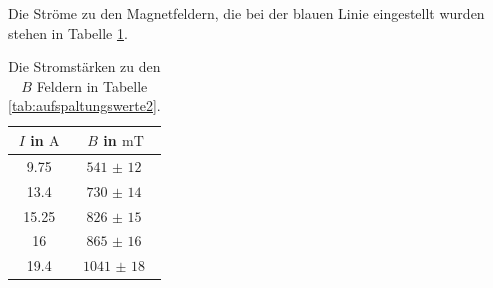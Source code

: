 \documentclass[
  bibliography=totoc,     %
  captions=tableheading,  %
  titlepage=firstiscover, %
]{scrartcl}
\begin{document}
\noindent
Die Ströme zu den Magnetfeldern, die bei der blauen Linie eingestellt wurden stehen
in Tabelle \ref{tab:ströme}.
\begin{table}[H]
  \centering
  \caption{Die Stromstärken zu den $B$ Feldern in Tabelle \ref{tab:aufspaltungswerte2}.}
  \label{tab:ströme}
  \begin{tabular}{c c}
    \toprule
    $I$ in $\si{\ampere}$ & $B$ in $\si{\milli\tesla}$ \\
    \midrule
    9.75  & $\SI{541(12)}{}$  \\
    13.4  & $\SI{730(14)}{}$  \\
    15.25 & $\SI{826(15)}{}$  \\
    16    & $\SI{865(16)}{}$  \\
    19.4  & $\SI{1041(18)}{}$ \\
    \bottomrule
  \end{tabular}
\end{table}
\end{document}

